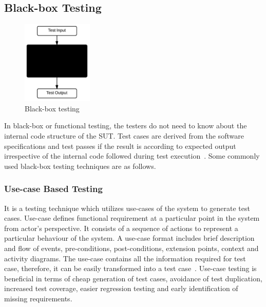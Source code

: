 \subsection{Black-box Testing}
\begin{figure}
  \vspace{-35pt}
  \begin{center}
    \includegraphics[width=0.30\textwidth]{chapter2/blackBox.png}
  \end{center}
  \vspace{-20pt}
  \bigskip
  \caption{Black-box testing}
  \label{fig:blackBox}
  \vspace{-18pt}
 \end{figure}
In black-box or functional testing, the testers do not need to know about the internal code structure of the SUT. Test cases are derived from the software specifications and test passes if the result is according to expected output irrespective of the internal code followed during test execution~\cite{beizer1995black}. Some commonly used black-box testing techniques are as follows.



\subsubsection{Use-case Based Testing}
It is a testing technique which utilizes use-cases of the system to generate test cases. Use-case defines functional requirement at a particular point in the system from actor's perspective. It consists of a sequence of actions to represent a particular behaviour of the system. A use-case format includes brief description and flow of events, pre-conditions, post-conditions, extension points, context and activity diagrams. The use-case contains all the information required for test case, therefore, it can be easily transformed into a test case~\cite{armour2000advanced}. Use-case testing is beneficial in terms of cheap generation of test cases, avoidance of test duplication, increased test coverage, easier regression testing and early identification of missing requirements.  

